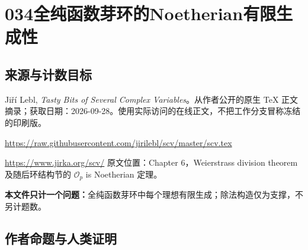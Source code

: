 \documentclass[UTF8,11pt]{ctexart}
\theoremstyle{definition}
\newcommand{\sO}{\mathscr O}
\begin{document}
\section*{034\quad 全纯函数芽环的Noetherian有限生成性}
\subsection*{来源与计数目标}
Ji\v{r}\'i Lebl, \emph{Tasty Bits of Several Complex Variables}。从作者公开的原生 TeX 正文摘录；获取日期：2026-09-28。使用实际访问的在线正文，不把工作分支冒称冻结的印刷版。
\par\url{https://raw.githubusercontent.com/jirilebl/scv/master/scv.tex}
\par\url{https://www.jirka.org/scv/}
原文位置：Chapter 6，Weierstrass division theorem 及随后环结构节的 $\sO_p$ is Noetherian 定理。
\par\textbf{本文件只计一个问题：}全纯函数芽环中每个理想有限生成；除法构造仅为支撑，不另计题数。
\subsection*{作者命题与人类证明}
\end{document}
